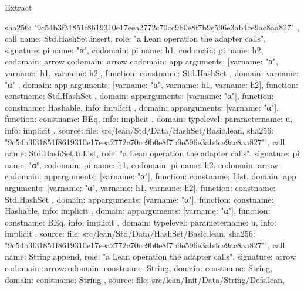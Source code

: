 \begin{lexlean}{Extract}
\begin{toolingmodule}
{{{        sha256: "9c54b3f31851f8619310e17eea2772c70cc9b0e8f7b9e596e3ab4ce9ac8aa827"
      }
    },
    call{
      name: Std.HashSet.insert,
      role: "a Lean operation the adapter calls",
      signature: pi{
        name: "α",
        codomain: pi{
          name: h1,
          codomain: pi{
            name: h2,
            codomain: arrow{
              codomain: arrow{
                codomain: app{
                  arguments: [var{name: "α"}, var{name: h1}, var{name: h2}],
                  function: const{name: Std.HashSet}
                },
                domain: var{name: "α"}
              },
              domain: app{
                arguments: [var{name: "α"}, var{name: h1}, var{name: h2}],
                function: const{name: Std.HashSet}
              }
            },
            domain: app{arguments: [var{name: "α"}], function: const{name: Hashable}},
            info: implicit
          },
          domain: app{arguments: [var{name: "α"}], function: const{name: BEq}},
          info: implicit
        },
        domain: type{level: parameter{name: u}},
        info: implicit
      },
      source: {
        file: src/lean/Std/Data/HashSet/Basic.lean,
        sha256: "9c54b3f31851f8619310e17eea2772c70cc9b0e8f7b9e596e3ab4ce9ac8aa827"
      }
    },
    call{
      name: Std.HashSet.toList,
      role: "a Lean operation the adapter calls",
      signature: pi{
        name: "α",
        codomain: pi{
          name: h1,
          codomain: pi{
            name: h2,
            codomain: arrow{
              codomain: app{arguments: [var{name: "α"}], function: const{name: List}},
              domain: app{
                arguments: [var{name: "α"}, var{name: h1}, var{name: h2}],
                function: const{name: Std.HashSet}
              }
            },
            domain: app{arguments: [var{name: "α"}], function: const{name: Hashable}},
            info: implicit
          },
          domain: app{arguments: [var{name: "α"}], function: const{name: BEq}},
          info: implicit
        },
        domain: type{level: parameter{name: u}},
        info: implicit
      },
      source: {
        file: src/lean/Std/Data/HashSet/Basic.lean,
        sha256: "9c54b3f31851f8619310e17eea2772c70cc9b0e8f7b9e596e3ab4ce9ac8aa827"
      }
    },
    call{
      name: String.append,
      role: "a Lean operation the adapter calls",
      signature: arrow{
        codomain: arrow{codomain: const{name: String}, domain: const{name: String}},
        domain: const{name: String}
      },
      source: {
        file: src/lean/Init/Data/String/Defs.lean,
}}}
\end{toolingmodule}
\end{lexlean}
